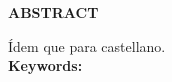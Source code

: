 \begin{centering}
\Large{\textbf{ABSTRACT}}

\end{centering}

Ídem que para castellano. \\

\textbf{Keywords:} 
